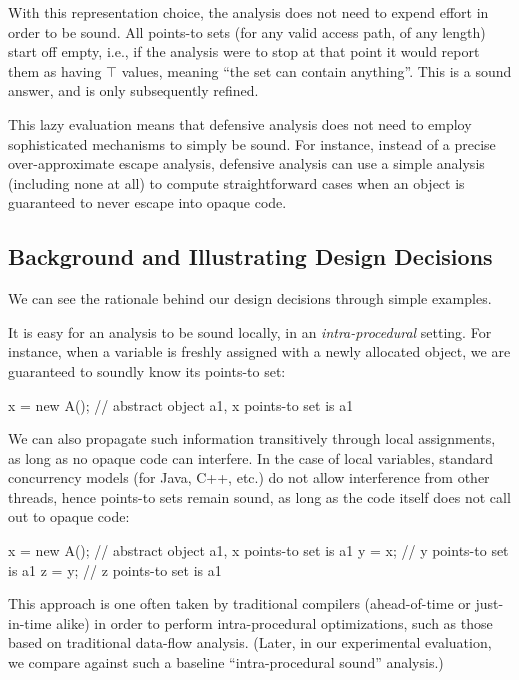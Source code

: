 With this representation choice, the analysis does not need to expend effort in order to be sound. All points-to sets (for any valid access path, of any length) start off empty, i.e., if the analysis were to stop at that point it would report them as having $\top$ values, meaning ``the set can contain anything''. This is a sound answer, and is only subsequently refined.

This lazy evaluation means that defensive analysis does not need to employ sophisticated mechanisms to simply be sound. For instance, instead of a precise over-approximate escape analysis, defensive analysis can use a simple analysis (including none at all) to compute straightforward cases when an object is guaranteed to never escape into opaque code.



\subsection{Background and Illustrating Design Decisions}
\label{sec:sound:principles}

We can see the rationale behind our design decisions through simple examples.

It is easy for an analysis to be sound locally, in an \emph{intra-procedural} setting. For instance, when a variable is freshly assigned with a newly allocated object, we are guaranteed to soundly know its points-to set:

\begin{javaBox}
x = new A();  // abstract object a1, x points-to set is {a1}
\end{javaBox}

We can also propagate such information transitively through local assignments, as long as no opaque code can interfere. In the case of local variables, standard concurrency models (for Java, C++, etc.) do not allow interference from other threads, hence points-to sets remain sound, as long as the code itself does not call out to opaque code:

\begin{javaBox}
x = new A();  // abstract object a1, x points-to set is {a1}
y = x;        // y points-to set is {a1}
z = y;        // z points-to set is {a1}
\end{javaBox}

This approach is one often taken by traditional compilers (ahead-of-time or just-in-time alike) in order to perform intra-procedural optimizations, such as those based on traditional data-flow analysis. (Later, in our experimental evaluation, we compare against such a baseline ``intra-procedural sound'' analysis.)


